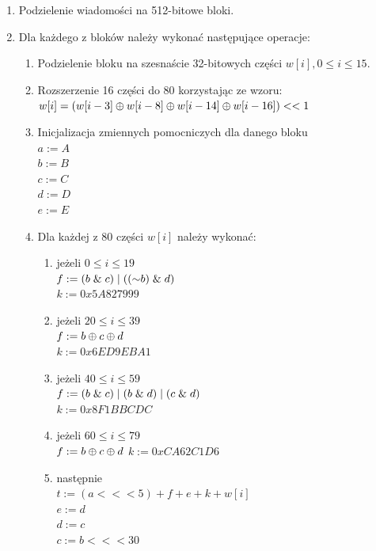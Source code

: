 \begin{enumerate}
\begin{enumerate}
{					00000000 00000000 00000000 00000031 }
		\end{enumerate}
	\item Podzielenie wiadomości na 512-bitowe bloki.
	\item Dla każdego z bloków należy wykonać następujące operacje:
		\begin{enumerate}
			\item Podzielenie bloku na szesnaście 32-bitowych części $w[i], 0 \leq i \leq 15$.
			\item Rozszerzenie 16 części do 80 korzystając ze wzoru: \\
				$w[i] = (w[i-3] \mathbin{\oplus} w[i-8] \mathbin{\oplus} w[i-14] \mathbin{\oplus} w[i-16]) << 1$
			\item Inicjalizacja zmiennych pomocniczych dla danego bloku \\
				$a := A$ \\
				$b := B$ \\
				$c := C$ \\
				$d := D$ \\
				$e := E$ 
			\item Dla każdej z 80 części $w[i]$ należy wykonać:
				\begin{enumerate}
					\item jeżeli $0 \leq i \leq 19$ \\
			        	$f := (b \mathrel{\&} c) \mathrel{|} ((\mathord{\sim} b) \mathrel{\&} d)$ \\
			            $k := 0x5A827999$
					\item jeżeli $20 \leq i \leq 39$ \\
           				$f := b \mathbin{\oplus} c \mathbin{\oplus} d$ \\
          				$k := 0x6ED9EBA1$
				    \item jeżeli $40 \leq i \leq 59$ \\
			        	$f := (b \mathrel{\&} c) \mathrel{|} (b \mathrel{\&} d) \mathrel{|} (c \mathrel{\&} d)$ \\
           				$k := 0x8F1BBCDC$
        			\item jeżeli $60 \leq i \leq 79$ \\
			            $f := b \mathbin{\oplus} c \mathbin{\oplus} d$
   	        			$k := 0xCA62C1D6$
            		\item następnie \\
           				$t := (a <<< 5) + f + e + k + w[i]$ \\
				        $e := d$ \\
				        $d := c$\\
				        $c := b <<< 30$\\

\end{enumerate}
\end{enumerate}
\end{enumerate}
